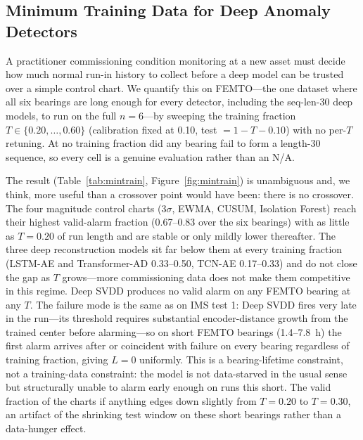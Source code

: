 \documentclass[IJPHM, 2026, 0]{PHMSociety}
\begin{document}
\subsection{Minimum Training Data for Deep Anomaly Detectors}
\label{sec:mintrain}
A practitioner commissioning condition monitoring at a new asset must decide how much normal run-in history to collect before a deep model can be trusted over a simple control chart. We quantify this on FEMTO---the one dataset where all six bearings are long enough for every detector, including the seq-len-30 deep models, to run on the full $n=6$---by sweeping the training fraction $T \in \{0.20, \dots, 0.60\}$ (calibration fixed at 0.10, test $= 1-T-0.10$) with no per-$T$ retuning. At no training fraction did any bearing fail to form a length-30 sequence, so every cell is a genuine evaluation rather than an N/A.

The result (Table~\ref{tab:mintrain}, Figure~\ref{fig:mintrain}) is unambiguous and, we think, more useful than a crossover point would have been: there is no crossover. The four magnitude control charts ($3\sigma$, EWMA, CUSUM, Isolation Forest) reach their highest valid-alarm fraction (0.67--0.83 over the six bearings) with as little as $T=0.20$ of run length and are stable or only mildly lower thereafter. The three deep reconstruction models sit far below them at every training fraction (LSTM-AE and Transformer-AD 0.33--0.50, TCN-AE 0.17--0.33) and do not close the gap as $T$ grows---more commissioning data does not make them competitive in this regime. Deep SVDD produces no valid alarm on any FEMTO bearing at any $T$. The failure mode is the same as on IMS test 1: Deep SVDD fires very late in the run---its threshold requires substantial encoder-distance growth from the trained center before alarming---so on short FEMTO bearings (1.4--7.8~h) the first alarm arrives after or coincident with failure on every bearing regardless of training fraction, giving $L=0$ uniformly. This is a bearing-lifetime constraint, not a training-data constraint: the model is not data-starved in the usual sense but structurally unable to alarm early enough on runs this short. The valid fraction of the charts if anything edges down slightly from $T=0.20$ to $T=0.30$, an artifact of the shrinking test window on these short bearings rather than a data-hunger effect.
\end{document}
